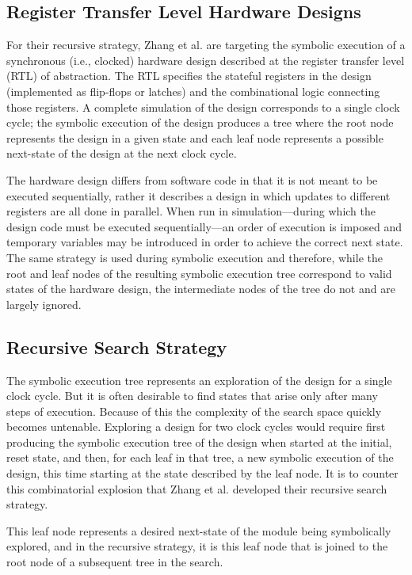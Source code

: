 \subsection{Register Transfer Level Hardware Designs}
For their recursive strategy, Zhang et al. are targeting the symbolic execution
of a synchronous (i.e., clocked) hardware design described at the register transfer level (RTL)
of abstraction. The RTL specifies the stateful registers in the design
(implemented as flip-flops or latches) and the
combinational logic connecting those registers. A complete simulation of the design
corresponds to a single clock cycle; the symbolic execution of the design
produces a tree where the root node represents the design in a given state and
each leaf node represents a possible next-state of the design at the next clock
cycle.

The hardware design differs from software code in that it is not meant
to be executed sequentially, rather it describes a design in which updates to
different registers are all done in parallel. When run in simulation---during
which the design code must
be executed sequentially---an order of execution
is imposed and temporary variables may be introduced in order to achieve the
correct next state. The same strategy is used during symbolic execution and
therefore, while the root and leaf nodes of the resulting symbolic
execution tree correspond to valid states of the hardware design, the
intermediate nodes of the tree do not and are largely ignored. 


\subsection{Recursive Search Strategy}
The symbolic execution tree represents an exploration of the design for a single
clock cycle. But it is often desirable to find states that arise only after many
steps of execution. Because of this the complexity of the search space quickly
becomes untenable. Exploring a design for two clock cycles would require first
producing the symbolic execution tree of the design when started at the initial,
reset state, and then, for each leaf in that tree, a new symbolic execution of
the design, this time starting at the state described by the leaf node. It is to
counter this combinatorial explosion that Zhang et al. developed their recursive
search strategy. 

 This
leaf node represents a desired next-state of the module being symbolically
explored, and in the recursive strategy, it is this leaf node that is joined to
the root node of a subsequent tree in the search.




